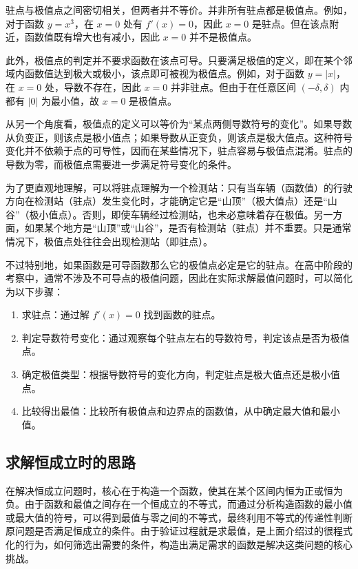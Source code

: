 驻点与极值点之间密切相关，但两者并不等价。并非所有驻点都是极值点。例如，对于函数 $y = x^3$，在 $x = 0$ 处有 $f'(x) = 0$，因此 $x = 0$ 是驻点。但在该点附近，函数值既有增大也有减小，因此 $x = 0$ 并不是极值点。

此外，极值点的判定并不要求函数在该点可导。只要满足极值的定义，即在某个邻域内函数值达到极大或极小，该点即可被视为极值点。例如，对于函数 $y = |x|$，在 $x = 0$ 处，导数不存在，因此 $x = 0$ 并非驻点。但由于在任意区间 $(-\delta, \delta)$ 内都有 $|0|$ 为最小值，故 $x = 0$ 是极值点。

从另一个角度看，极值点的定义可以等价为“某点两侧导数符号的变化”。如果导数从负变正，则该点是极小值点；如果导数从正变负，则该点是极大值点。这种符号变化并不依赖于点的可导性，因而在某些情况下，驻点容易与极值点混淆。驻点的导数为零，而极值点需要进一步满足符号变化的条件。

为了更直观地理解，可以将驻点理解为一个检测站：只有当车辆（函数值）的行驶方向在检测站（驻点）发生变化时，才能确定它是“山顶”（极大值点）还是“山谷”（极小值点）。否则，即使车辆经过检测站，也未必意味着存在极值。另一方面，如果某个地方是“山顶”或“山谷”，是否有检测站（驻点）并不重要。只是通常情况下，极值点处往往会出现检测站（即驻点）。

不过特别地，如果函数是可导函数那么它的极值点必定是它的驻点。在高中阶段的考察中，通常不涉及不可导点的极值问题，因此在实际求解最值问题时，可以简化为以下步骤：

\begin{enumerate}
\item 求驻点：通过解 $f'(x) = 0$ 找到函数的驻点。
\item 判定导数符号变化：通过观察每个驻点左右的导数符号，判定该点是否为极值点。
\item 确定极值类型：根据导数符号的变化方向，判定驻点是极大值点还是极小值点。
\item 比较得出最值：比较所有极值点和边界点的函数值，从中确定最大值和最小值。
\end{enumerate}

\subsection{求解恒成立时的思路}

在解决恒成立问题时，核心在于构造一个函数，使其在某个区间内恒为正或恒为负。由于函数和最值之间存在一个恒成立的不等式，而通过分析构造函数的最小值或最大值的符号，可以得到最值与零之间的不等式，最终利用不等式的传递性判断原问题是否满足恒成立的条件。由于验证过程就是求最值，是上面介绍过的很程式化的行为，如何筛选出需要的条件，构造出满足需求的函数是解决这类问题的核心挑战。

